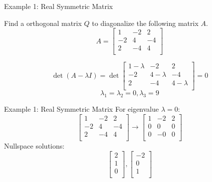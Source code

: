 \documentclass{beamer}
\begin{document}
\begin{frame}{Example 1: Real Symmetric Matrix}
    \begin{example}
        Find a orthogonal matrix $Q$ to diagonalize the following matrix $A$.
        \begin{equation*}
            A=\left[ \begin{matrix}
                1&		-2&		2\\
                -2&		4&		-4\\
                2&		-4&		4\\
            \end{matrix} \right]
        \end{equation*}
    \end{example}
    \begin{equation*}
        \det \left( A-\lambda I \right) =\det \left[ \begin{matrix}
            1-\lambda&		-2&		2\\
            -2&		4-\lambda&		-4\\
            2&		-4&		4-\lambda\\
        \end{matrix} \right] =0
    \end{equation*}
    \begin{equation*}
        \lambda_1=\lambda_2=0, \lambda_3=9
    \end{equation*}
\end{frame}

\begin{frame}{Example 1: Real Symmetric Matrix}
For eigenvalue $\lambda=0$:
\begin{equation*}
    \left[ \begin{matrix}
        1&		-2&		2\\
        -2&		4&		-4\\
        2&		-4&		4\\
    \end{matrix} \right] \rightarrow \left[ \begin{matrix}
        1&		-2&		2\\
        0&		0&		0\\
        0&		-0&		0\\
    \end{matrix} \right]
\end{equation*}
Nullspace solutions:
\begin{equation*}
    \left[ \begin{array}{c}
        2\\
        1\\
        0\\
    \end{array} \right] ,\left[ \begin{array}{c}
        -2\\
        0\\
        1\\
    \end{array} \right]
\end{equation*}

\end{frame}
\end{document}
